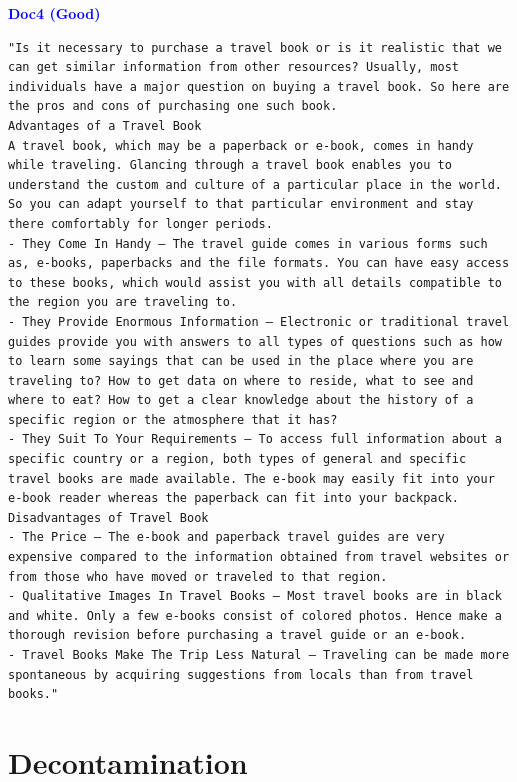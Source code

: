 \documentclass{article}
\begin{document}
\textcolor{blue}{\textbf{Doc4 (Good)}}
\begin{scriptsize}
\begin{Verbatim}[frame=single, framesep=3mm, breaklines=true]
"Is it necessary to purchase a travel book or is it realistic that we can get similar information from other resources? Usually, most individuals have a major question on buying a travel book. So here are the pros and cons of purchasing one such book.
Advantages of a Travel Book
A travel book, which may be a paperback or e-book, comes in handy while traveling. Glancing through a travel book enables you to understand the custom and culture of a particular place in the world. So you can adapt yourself to that particular environment and stay there comfortably for longer periods.
- They Come In Handy — The travel guide comes in various forms such as, e-books, paperbacks and the file formats. You can have easy access to these books, which would assist you with all details compatible to the region you are traveling to.
- They Provide Enormous Information — Electronic or traditional travel guides provide you with answers to all types of questions such as how to learn some sayings that can be used in the place where you are traveling to? How to get data on where to reside, what to see and where to eat? How to get a clear knowledge about the history of a specific region or the atmosphere that it has?
- They Suit To Your Requirements — To access full information about a specific country or a region, both types of general and specific travel books are made available. The e-book may easily fit into your e-book reader whereas the paperback can fit into your backpack.
Disadvantages of Travel Book
- The Price — The e-book and paperback travel guides are very expensive compared to the information obtained from travel websites or from those who have moved or traveled to that region.
- Qualitative Images In Travel Books — Most travel books are in black and white. Only a few e-books consist of colored photos. Hence make a thorough revision before purchasing a travel guide or an e-book.
- Travel Books Make The Trip Less Natural — Traveling can be made more spontaneous by acquiring suggestions from locals than from travel books."
\end{Verbatim}
\end{scriptsize}


\section{Decontamination}\label{appx:decontamination}
\end{document}
